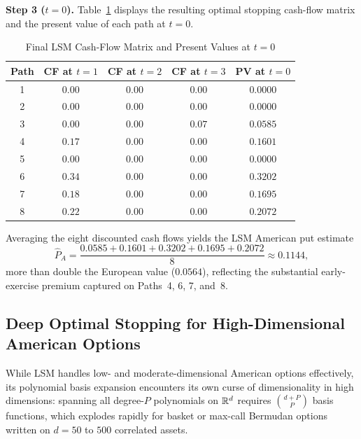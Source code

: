 \begin{example}
    \textbf{Step 3 ($t = 0$).} Table~\ref{tab:lsm-cf} displays the resulting optimal stopping cash-flow matrix and the present value of each path at $t = 0$.

    \begin{table}[!htbp]
        \centering
        \small
        \caption{Final LSM Cash-Flow Matrix and Present Values at $t = 0$}\label{tab:lsm-cf}
        \begin{tabular}{c c c c c}
            \toprule
            \textbf{Path} & \textbf{CF at $t = 1$} & \textbf{CF at $t = 2$} & \textbf{CF at $t = 3$} & \textbf{PV at $t = 0$} \\
            \midrule
            1 & $0.00$ & $0.00$ & $0.00$ & $0.0000$ \\
            2 & $0.00$ & $0.00$ & $0.00$ & $0.0000$ \\
            3 & $0.00$ & $0.00$ & $0.07$ & $0.0585$ \\
            4 & $0.17$ & $0.00$ & $0.00$ & $0.1601$ \\
            5 & $0.00$ & $0.00$ & $0.00$ & $0.0000$ \\
            6 & $0.34$ & $0.00$ & $0.00$ & $0.3202$ \\
            7 & $0.18$ & $0.00$ & $0.00$ & $0.1695$ \\
            8 & $0.22$ & $0.00$ & $0.00$ & $0.2072$ \\
            \bottomrule
        \end{tabular}
    \end{table}

    Averaging the eight discounted cash flows yields the LSM American put estimate
    \[
    \hat{P}_A = \frac{0.0585 + 0.1601 + 0.3202 + 0.1695 + 0.2072}{8} \approx 0.1144,
    \]
    more than double the European value ($0.0564$), reflecting the substantial early-exercise premium captured on Paths~4, 6, 7, and~8.
\end{example}

\subsection{Deep Optimal Stopping for High-Dimensional American Options}

While LSM handles low- and moderate-dimensional American options effectively, its polynomial basis expansion encounters its own curse of dimensionality in high dimensions: spanning all degree-$P$ polynomials on $\mathbb{R}^d$ requires $\binom{d + P}{P}$ basis functions, which explodes rapidly for basket or max-call Bermudan options written on $d = 50$ to $500$ correlated assets.

